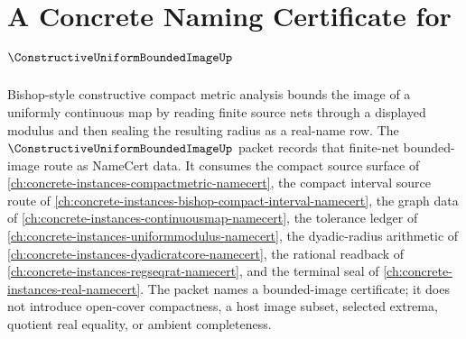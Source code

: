\chapter{A Concrete Naming Certificate for $\ConstructiveUniformBoundedImageUp$}
\label{ch:concrete-instances-constructive-uniform-bounded-image-namecert}

Bishop-style constructive compact metric analysis bounds the image of a uniformly continuous map by reading finite source nets through a displayed modulus and then sealing the resulting radius as a real-name row. The $\ConstructiveUniformBoundedImageUp$ packet records that finite-net bounded-image route as NameCert data. It consumes the compact source surface of \autoref{ch:concrete-instances-compactmetric-namecert}, the compact interval source route of \autoref{ch:concrete-instances-bishop-compact-interval-namecert}, the graph data of \autoref{ch:concrete-instances-continuousmap-namecert}, the tolerance ledger of \autoref{ch:concrete-instances-uniformmodulus-namecert}, the dyadic-radius arithmetic of \autoref{ch:concrete-instances-dyadicratcore-namecert}, the rational readback of \autoref{ch:concrete-instances-regseqrat-namecert}, and the terminal seal of \autoref{ch:concrete-instances-real-namecert}. The packet names a bounded-image certificate; it does not introduce open-cover compactness, a host image subset, selected extrema, quotient real equality, or ambient completeness.

